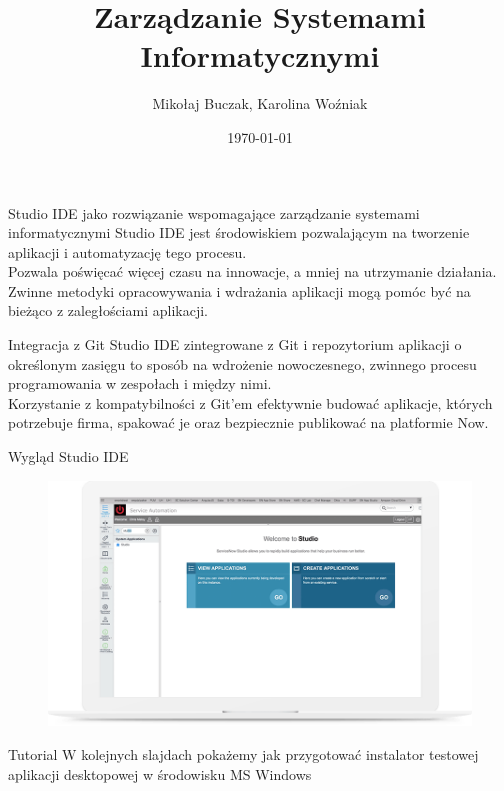 \documentclass{beamer}
\title[M2.2]{Zarządzanie Systemami Informatycznymi}
\author{Mikołaj Buczak, Karolina Woźniak}
\institute{Politechnika Śląska}
\date{\today}
\begin{document}
\begin{frame}
  \titlepage
\end{frame}

\begin{frame}{Studio IDE jako rozwiązanie wspomagające zarządzanie systemami informatycznymi }
    Studio IDE jest środowiskiem pozwalającym na tworzenie aplikacji i automatyzację tego procesu.\\
    Pozwala poświęcać więcej czasu na innowacje, a mniej na utrzymanie działania.\\
    Zwinne metodyki opracowywania i wdrażania aplikacji mogą pomóc być na bieżąco z zaległościami aplikacji.
\end{frame}
\begin{frame}{Integracja z Git}
    Studio IDE zintegrowane z Git i repozytorium aplikacji o określonym zasięgu to sposób na wdrożenie nowoczesnego, zwinnego procesu programowania w zespołach i między nimi.\\
    Korzystanie z kompatybilności z Git'em efektywnie budować aplikacje, których potrzebuje firma, spakować je oraz bezpiecznie publikować na platformie Now.
\end{frame}
\begin{frame}{Wygląd Studio IDE}
    \begin{figure}[H!]
        \centering
        \includegraphics[width=\textwidth]{IDE.png}
        \label{fig:my_label}
    \end{figure}
\end{frame}

\begin{frame}{Tutorial}
    W kolejnych slajdach pokażemy jak przygotować instalator testowej aplikacji desktopowej w środowisku MS Windows
\end{frame}
\end{document}
